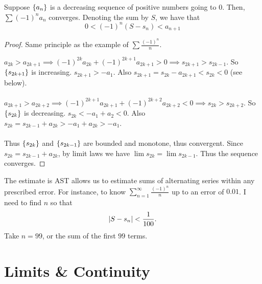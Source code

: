 \documentclass[12pt]{article}
\begin{document}
\begin{thm} \label{thm:leibniz test}
    Suppose $\set{a_{n}}$ is a decreasing sequence of positive numbers going to 0. Then, $\sum (-1)^{n} a_{n}$ converges. Denoting the sum by $S$, we have that \[
        0 < (-1)^{n}(S - s_{n}) < a_{n+1}
    \]
\end{thm}
\begin{proof}
    Same principle as the example of $\sum \frac{(-1)^{n}}{n}$.

    $a_{2k} > a_{2k+1} \implies (-1)^{2k} a_{2k} + (-1)^{2k+1} a_{2k+1} > 0 \implies s_{2k+1} > s_{2k-1}$. So $\set{s_{2k+1}}$ is increasing. $s_{2k+1} > -a_{1}$. Also $s_{2k+1} = s_{2k} - a_{2k+1} < s_{2k} < 0$ (see below).
    \\\\
    $a_{2k+1} > a_{2k+2} \implies (-1)^{2k+1} a_{2k+1} + (-1)^{2k+2} a_{2k+2} < 0 \implies s_{2k} > s_{2k+2}$. So $\set{s_{2k}}$ is decreasing. $s_{2k} < -a_{1} + a_{2} < 0$. Also $s_{2k} = s_{2k-1} + a_{2k} > -a_{1} + a_{2k} > -a_{1}$.
    \\\\
    Thus $\set{s_{2k}}$ and $\set{s_{2k-1}}$ are bounded and monotone, thus convergent. Since $s_{2k} = s_{2k-1} + a_{2k}$, by limit laws we have $\lim s_{2k} = \lim s_{2k-1}$. Thus the sequence converges.
\end{proof}

\begin{rem}
    The estimate is AST allows us to estimate sums of alternating series within any prescribed error. For instance, to know $\sum_{n=1}^{\infty} \frac{(-1)^{n}}{n}$ up to an error of $0.01$. I need to find $n$ so that \[
        \abs{ S - s_{n} } < \frac{1}{100}.
    \]
    Take $n = 99$, or the sum of the first $99$ terms.
\end{rem}


\section{Limits \& Continuity}
\end{document}
